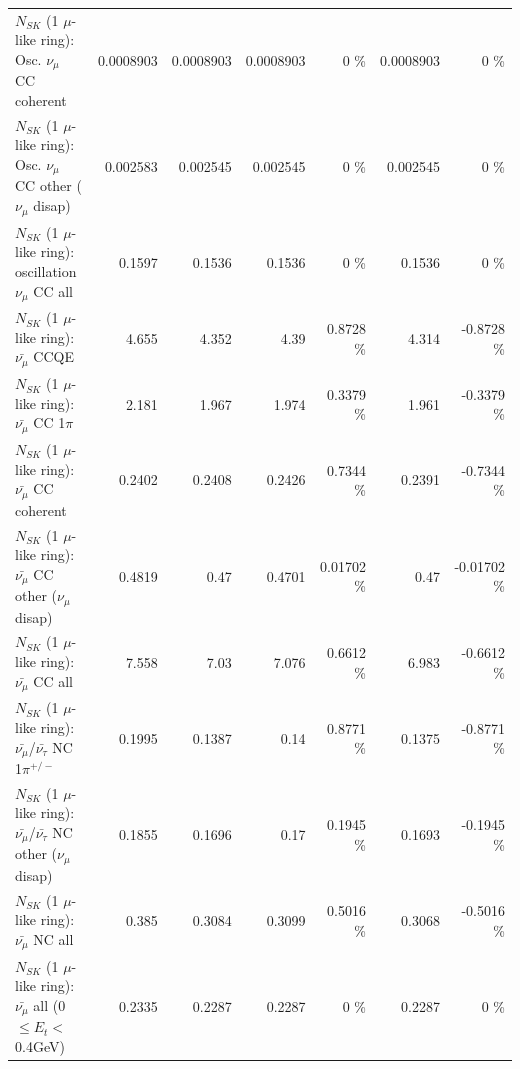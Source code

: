 \begin{table}
\begin{tabular}{| l | r | r | r  r | r  r |}
                        $N_{SK}$ (1 $\mu$-like ring): Osc. $\nu_\mu$ CC coherent &       0.0008903 &       0.0008903 &       0.0008903 &        0 \%  &       0.0008903 &        0 \%  \\ 
         $N_{SK}$ (1 $\mu$-like ring): Osc. $\nu_\mu$ CC other ($\nu_\mu$ disap) &        0.002583 &        0.002545 &        0.002545 &        0 \%  &        0.002545 &        0 \%  \\ 
                      $N_{SK}$ (1 $\mu$-like ring): oscillation $\nu_\mu$ CC all &          0.1597 &          0.1536 &          0.1536 &        0 \%  &          0.1536 &        0 \%  \\ 
\hline
\hline
                              $N_{SK}$ (1 $\mu$-like ring): $\bar{\nu_\mu}$ CCQE &           4.655 &           4.352 &            4.39 &   0.8728 \%  &           4.314 &  -0.8728 \%  \\ 
                         $N_{SK}$ (1 $\mu$-like ring): $\bar{\nu_\mu}$ CC 1$\pi$ &           2.181 &           1.967 &           1.974 &   0.3379 \%  &           1.961 &  -0.3379 \%  \\ 
                       $N_{SK}$ (1 $\mu$-like ring): $\bar{\nu_\mu}$ CC coherent &          0.2402 &          0.2408 &          0.2426 &   0.7344 \%  &          0.2391 &  -0.7344 \%  \\ 
        $N_{SK}$ (1 $\mu$-like ring): $\bar{\nu_\mu}$ CC other ($\nu_\mu$ disap) &          0.4819 &            0.47 &          0.4701 &  0.01702 \%  &            0.47 & -0.01702 \%  \\ 
                          $N_{SK}$ (1 $\mu$-like ring): $\bar{\nu_{\mu}}$ CC all &           7.558 &            7.03 &           7.076 &   0.6612 \%  &           6.983 &  -0.6612 \%  \\ 
\hline
  $N_{SK}$ (1 $\mu$-like ring): $\bar{\nu_\mu}$/$\bar{\nu_\tau}$ NC 1$\pi^{+/-}$ &          0.1995 &          0.1387 &            0.14 &   0.8771 \%  &          0.1375 &  -0.8771 \%  \\ 
$N_{SK}$ (1 $\mu$-like ring): $\bar{\nu_\mu}$/$\bar{\nu_\tau}$ NC other ($\nu_\mu$ disap) &          0.1855 &          0.1696 &            0.17 &   0.1945 \%  &          0.1693 &  -0.1945 \%  \\ 
                          $N_{SK}$ (1 $\mu$-like ring): $\bar{\nu_{\mu}}$ NC all &           0.385 &          0.3084 &          0.3099 &   0.5016 \%  &          0.3068 &  -0.5016 \%  \\ 
\hline
   $N_{SK}$ (1 $\mu$-like ring): $\bar{\nu_{\mu}}$ all (0 $\leq E_{t} <$ 0.4GeV) &          0.2335 &          0.2287 &          0.2287 &        0 \%  &          0.2287 &        0 \%  \\ 

\end{tabular}
\end{table}
